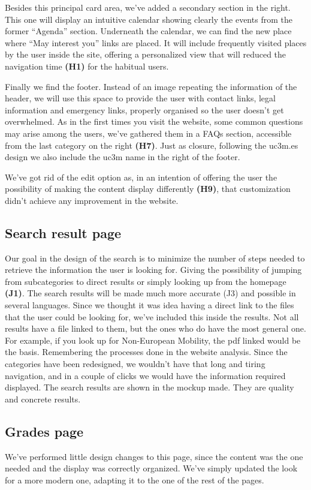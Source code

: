 \documentclass{article}
\begin{document}
Besides this principal card area, we’ve added a secondary section in the right. This one will display an intuitive calendar showing clearly the events from the former “Agenda” section. Underneath the calendar, we can find the new place where “May interest you” links are placed. It will include frequently visited places by the user inside the site, offering a personalized view that will reduced the navigation time \textbf{(H1)} for the habitual users.

Finally we find the footer. Instead of an image repeating the information of the header, we will use this space to provide the user with contact links, legal information and emergency links, properly organised so the user doesn’t get overwhelmed. As in the first times you visit the website, some common questions may arise among the users, we’ve gathered them in a FAQs section, accessible from the last category on the right \textbf{(H7)}. Just as closure, following the uc3m.es design we also include the uc3m name in the right of the footer.

We’ve got rid of the edit option as, in an intention of offering the user the possibility of making the content display differently \textbf{(H9)}, that customization didn’t achieve any improvement in the website.


\subsection{Search result page}
Our goal in the design of the search is to minimize the number of steps needed to retrieve the information the user is looking for. Giving the possibility of jumping from subcategories to direct results or simply looking up from the homepage \textbf{(J1)}. The search results will be made much more accurate (J3) and possible in several languages. Since we thought it was idea having a direct link to the files that the user could be looking for, we’ve included this inside the results. Not all results have a file linked to them, but the ones who do have the most general one. For example, if you look up for Non-European Mobility, the pdf linked would be the basis.
Remembering the processes done in the website analysis. Since the categories have been redesigned, we wouldn’t have that long and tiring navigation, and in a couple of clicks we would have the information required displayed. The search results are shown in the mockup made. They are quality and concrete results.
\subsection{Grades page}
We’ve performed little design changes to this page, since the content was the one needed and the display was correctly organized. We’ve simply updated the look for a more modern one, adapting it to the one of the rest of the pages.
\end{document}
